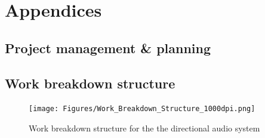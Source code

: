 \section{Appendices}
\begin{appendices}
\section{Project management \& planning}
\subsection{Work breakdown structure}
\begin{figure}[h]
    \centering
    \texttt{[image: Figures/Work\_Breakdown\_Structure\_1000dpi.png]}
    \caption{Work breakdown structure for the the directional audio system}
    \label{fig:wbs}
\end{figure}

\end{appendices}
